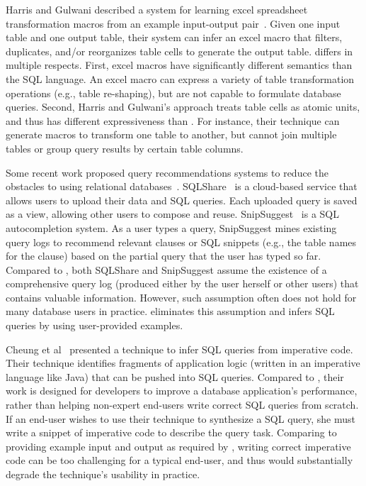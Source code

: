 Harris and Gulwani described a system for learning excel
spreadsheet transformation macros from an example
input-output pair~\cite{Harris:2011}. Given one input table and one output
table, their system can infer an excel macro that filters,
duplicates, and/or reorganizes table cells to generate the output table.
\ourtool differs in multiple respects.
First, excel macros have significantly different
semantics than the SQL language.
An excel macro can express a variety of table transformation operations
(e.g., table re-shaping), but are not capable to formulate database queries.
Second, Harris and Gulwani's approach treats table cells
as atomic units, and thus has different expressiveness
than \ourtool. For instance, their technique can generate macros to
transform one table to another, but cannot join multiple
tables or group query results by certain table columns. 




Some recent work proposed query recommendations systems to reduce
the obstacles to using relational databases~\cite{Howe:2011, Khoussainova:2010}. 
SQLShare~\cite{Howe:2011} is a cloud-based service that allows
users to upload their data and SQL queries. 
Each uploaded query is saved as a view, allowing other users
to compose and reuse. SnipSuggest~\cite{Khoussainova:2010} is a SQL autocompletion
system. As a user types a query, SnipSuggest mines existing query
logs to recommend relevant clauses or SQL snippets (e.g., the table
names for the  clause) based on the partial query that
the user has typed so far.
Compared to \ourtool, both SQLShare and SnipSuggest assume the
existence of a comprehensive query log (produced either
by the user herself or other users)
that contains valuable information.
However, such assumption often does not hold for
many database users in practice.
\ourtool eliminates this assumption and infers 
SQL queries by using user-provided examples.


Cheung et al~\cite{abs-1208-2013} presented a technique to infer SQL
queries from imperative code. Their technique identifies
fragments of application logic (written in an imperative language
like Java) that can be pushed into SQL queries. 
Compared to \ourtool, their work is designed for developers
to improve a database application's performance,
rather than helping non-expert end-users
write correct SQL queries from scratch. 
If an end-user wishes to use their technique to 
synthesize a SQL query, she must write a snippet of
imperative code to describe the query task.
Comparing to providing example input
and output as required by \ourtool,
writing correct imperative code can be too challenging
for a typical end-user, and thus would
substantially degrade the technique's usability in practice.


